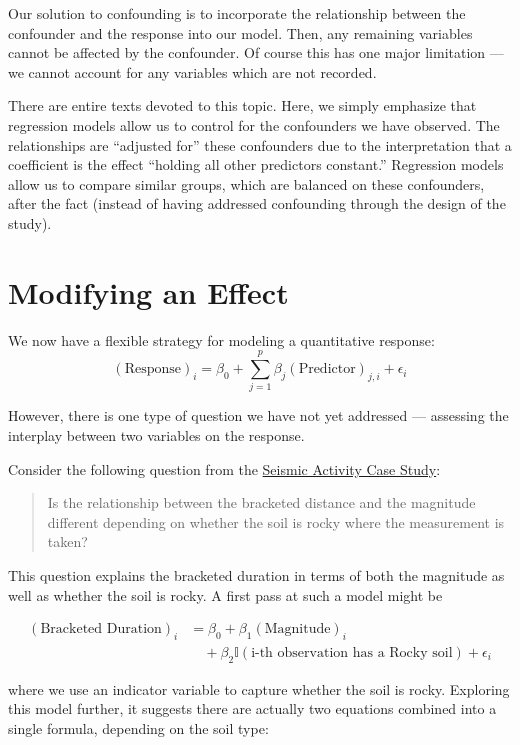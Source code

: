 \documentclass[
]{book}
\theoremstyle{plain}
\theoremstyle{mydefn}
\theoremstyle{myexmpl}
\theoremstyle{remark}
\begin{document}
Our solution to confounding is to incorporate the relationship between the confounder and the response into our model. Then, any remaining variables cannot be affected by the confounder. Of course this has one major limitation --- we cannot account for any variables which are not recorded.

There are entire texts devoted to this topic. Here, we simply emphasize that regression models allow us to control for the confounders we have observed. The relationships are ``adjusted for'' these confounders due to the interpretation that a coefficient is the effect ``holding all other predictors constant.'' Regression models allow us to compare similar groups, which are balanced on these confounders, after the fact (instead of having addressed confounding through the design of the study).

\hypertarget{modifying-an-effect}{%
\section{Modifying an Effect}\label{modifying-an-effect}}

We now have a flexible strategy for modeling a quantitative response:
\[(\text{Response})_i = \beta_0 + \sum_{j=1}^{p} \beta_j (\text{Predictor})_{j,i} + \epsilon_i\]

However, there is one type of question we have not yet addressed --- assessing the interplay between two variables on the response.

Consider the following question from the \protect\hyperlink{CaseGreece}{Seismic Activity Case Study}:

\begin{quote}
Is the relationship between the bracketed distance and the magnitude different depending on whether the soil is rocky where the measurement is taken?
\end{quote}

This question explains the bracketed duration in terms of both the magnitude as well as whether the soil is rocky. A first pass at such a model might be

\[
\begin{aligned}
  (\text{Bracketed Duration})_i &= \beta_0 + \beta_1(\text{Magnitude})_i \\
    &\quad + \beta_2\mathbb{I}(\text{i-th observation has a Rocky soil}) + \epsilon_i
\end{aligned}
\]

where we use an indicator variable to capture whether the soil is rocky. Exploring this model further, it suggests there are actually two equations combined into a single formula, depending on the soil type:
\end{document}
